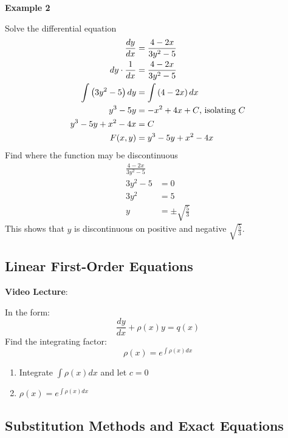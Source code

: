 \documentclass{article}
\begin{document}
\hr

\textbf{Example 2}

Solve the differential equation
\begin{align*}
    \frac{dy}{dx} & = \frac{4 - 2x}{3y^2 - 5} \\
    dy \cdot \frac{1}{dx} & = \frac{4 - 2x}{3y^2 - 5} \\
    \int \left( 3y^2 - 5 \right) dy & = \int \left( 4 - 2x \right) dx \\
    y^3 - 5y & = -x^2 + 4x + C \text{, isolating $ C $} \\
    y^3 - 5y + x^2 - 4x & = C \\
    F(x,y) & = y^3 - 5y + x^2 - 4x
\end{align*}
Find where the function may be discontinuous
\begin{align*}
    \frac{4 - 2x}{3y^2 - 5} \\
    3y^2 - 5 & = 0 \\
    3y^2 & = 5 \\
    y & = \pm \sqrt{\frac{5}{3}}
\end{align*}
This shows that $ y $ is discontinuous on positive and negative $ \sqrt{\frac{5}{3}} $.

\subsection{Linear First-Order Equations}

\textbf{Video Lecture}:

In the form:
$$ \frac{dy}{dx} + \rho(x)y = q(x) $$
Find the integrating factor:
$$ \rho(x) = e^{\int \rho(x)dx} $$
\begin{enumerate}
    \item Integrate $ \int \rho(x)dx $ and let $ c = 0 $
    \item $ \rho(x) = e^{\int \rho(x)dx} $
\end{enumerate}

\hr

\subsection{Substitution Methods and Exact Equations}
\end{document}
